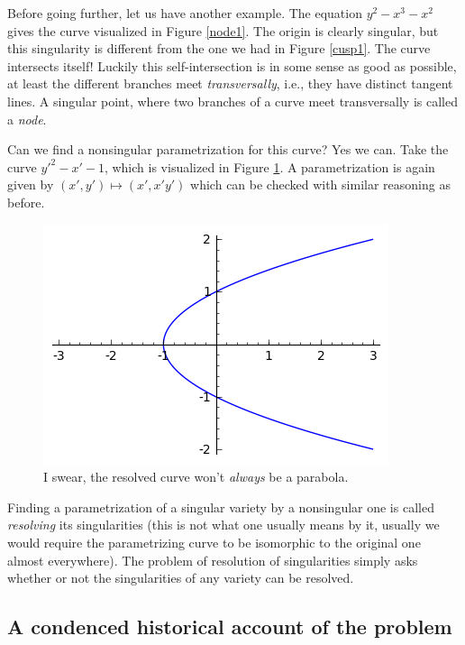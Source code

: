 \documentclass[12pt,a4paper,leqno]{article}
\newcommand{\fref}[1]{\hyperref[{#1}]{\ref*{#1}}}
\theoremstyle{plain}
\theoremstyle{definition}
\theoremstyle{remark}
\begin{document}
Before going further, let us have another example. The equation $y^2 - x^3 - x^2$ gives the curve visualized in Figure \fref{node1}. The origin is clearly singular, but this singularity is different from the one we had in Figure \fref{cusp1}. The curve intersects itself! Luckily this self-intersection is in some sense as good as possible, at least the different branches meet \emph{transversally}, i.e., they have distinct tangent lines. A singular point, where two branches of a curve meet transversally is called a \emph{node}. 

Can we find a nonsingular parametrization for this curve? Yes we can. Take the curve $y'^2 - x' - 1$, which is visualized in Figure \fref{nsing2}. A parametrization is again given by $(x', y') \mapsto (x', x'y')$ which can be checked with similar reasoning as before.


\begin{figure}[!htbp]\label{nsing2}
\begin{center}
\includegraphics{pics/parabola2.png}
\caption{I swear, the resolved curve won't \emph{always} be a parabola.}
\end{center}
\end{figure}

Finding a parametrization of a singular variety by a nonsingular one is called \emph{resolving} its singularities (this is not what one usually means by it, usually we would require the parametrizing curve to be isomorphic to the original one almost everywhere). The problem of resolution of singularities simply asks whether or not the singularities of any variety can be resolved. 

\subsection{A condenced historical account of the problem}
\end{document}
